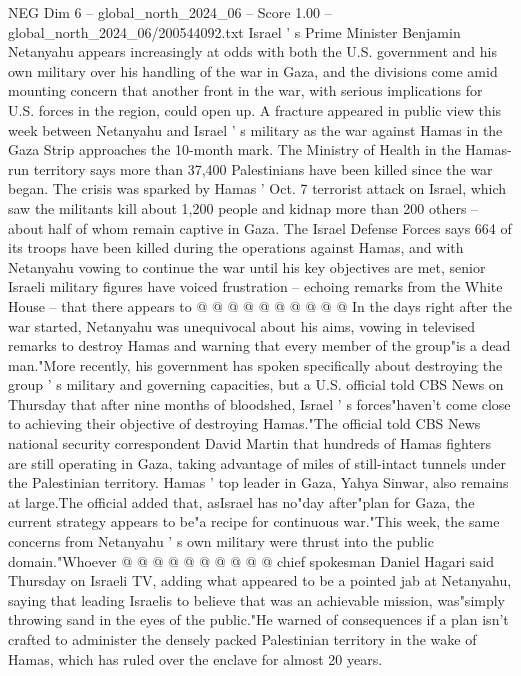 \begin{textsample}{NEG Dim 6 – global\_north\_2024\_06 – Score 1.00 – global\_north\_2024\_06/200544092.txt}  \label{ex:f6_neg_309}
Israel ' s Prime Minister Benjamin Netanyahu appears increasingly at odds with both the U.S. government and his own military over his handling of the war in Gaza, and the divisions come amid mounting concern that another front in the war, with serious implications for U.S. forces in the region, could open up.
A fracture appeared in public view this week between Netanyahu and Israel ' s military as the war against Hamas in the Gaza Strip approaches the 10-month mark.
The Ministry of Health in the Hamas-run territory says more than 37,400 Palestinians have been killed since the war began.
The crisis was sparked by Hamas ' Oct. 7 terrorist attack on Israel, which saw the militants kill about 1,200 people and kidnap more than 200 others -- about half of whom remain captive in Gaza.
The Israel Defense Forces says 664 of its troops have been killed during the operations against Hamas, and with Netanyahu vowing to continue the war until his key objectives are met, senior Israeli military figures have voiced frustration -- echoing remarks from the White House -- that there appears to @ @ @ @ @ @ @ @ @ @ In the days right after the war started, Netanyahu was unequivocal about his aims, vowing in televised remarks to destroy Hamas and warning that every member of the group"is a dead man."More recently, his government has spoken specifically about destroying the group ' s military and governing capacities, but a U.S. official told CBS News on Thursday that after nine months of bloodshed, Israel ' s forces"haven't come close to achieving their objective of destroying Hamas."The official told CBS News national security correspondent David Martin that hundreds of Hamas fighters are still operating in Gaza, taking advantage of miles of still-intact tunnels under the Palestinian territory.
Hamas ' top leader in Gaza, Yahya Sinwar, also remains at large.The official added that, asIsrael has no"day after"plan for Gaza, the current strategy appears to be"a recipe for continuous war."This week, the same concerns from Netanyahu ' s own military were thrust into the public domain."Whoever @ @ @ @ @ @ @ @ @ @ chief spokesman Daniel Hagari said Thursday on Israeli TV, adding what appeared to be a pointed jab at Netanyahu, saying that leading Israelis to believe that was an achievable mission, was"simply throwing sand in the eyes of the public."He warned of consequences if a plan isn't crafted to administer the densely packed Palestinian territory in the wake of Hamas, which has ruled over the enclave for almost 20 years.

\end{textsample}
